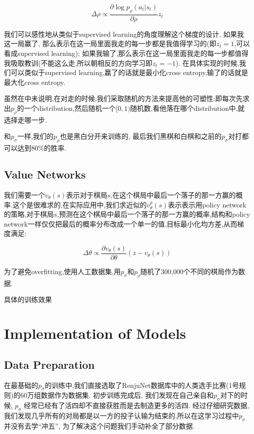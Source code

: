 \documentclass[twocolumn]{article}
\begin{document}
\[
\Delta\rho \propto \frac{\partial\log p_\rho(a_t|s_t)}{\partial \rho}z_t
\]

我们可以感性地从类似于supervised learning的角度理解这个梯度的设计, 如果我这一局赢了, 那么表示在这一局里面我走的每一步都是我值得学习的(即$z_t=1$,可以看成supervised learning); 如果我输了,那么表示在这一局里面我走的每一步都值得我吸取教训(不能这么走,所以朝相反的方向学习即$z_t=-1$). 在具体实现的时候,我们可以类似于supervised learning,赢了的话就是最小化cross entropy,输了的话就是最大化cross entropy.

虽然在\cite{alphago}中未说明,在对走的时候,我们采取随机的方法来提高他的可塑性:即每次先求出$p_\rho$的一个distribution,然后随机一个$[0,1)$随机数,看他落在哪个distribution中,就选择走哪一步.

和$p_\sigma$一样,我们的$p_\rho$也是黑白分开来训练的, 最后我们黑棋和白棋和之前的$p_\sigma$对打都可以达到$80\%$的胜率.

\subsection{Value Networks}

我们需要一个$v_\theta(s)$表示对于棋局$s$,在这个棋局中最后一个落子的那一方赢的概率.这个是很难求的,在实际应用中,我们求近似的$v^p_\theta(s)$表示表示用policy network的策略,对于棋局$s$,预测在这个棋局中最后一个落子的那一方赢的概率,结构和policy network一样仅仅把最后的概率分布改成一个单一的值,目标最小化均方差,从而梯度满足: 

\[
\Delta\theta \propto \frac{\partial v_\theta(s)}{\partial \theta}(z - v_\theta(s))
\]

为了避免overfitting,使用人工数据集,用$p_\sigma$和$p_\rho$随机了300,000个不同的棋局作为数据.

\textcolor[rgb]{1,0,0}{具体的训练效果}

\section{Implementation of Models}

\subsection{Data Preparation}

在最基础的$p_\sigma$的训练中,我们直接选取了RenjuNet\cite{renjunet}数据库中的人类选手比赛(1号规则)的60万组数据作为数据集. 初步训练完成后, 我们发现在自己亲自和$p_\sigma$对下的时候, $p_\sigma$ 经常已经有了活四却不直接获胜而是去制造更多的活四. 经过仔细研究数据, 我们发现几乎所有的对局都是以一方的投子认输为结束的,所以在这学习过程中$p_\sigma$并没有去学“冲五”, 为了解决这个问题我们手动补全了部分数据.
\end{document}
